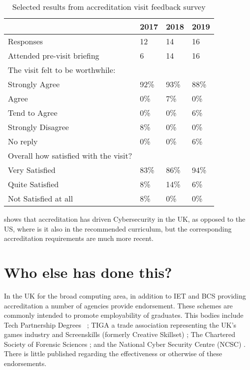\documentclass[sigconf]{acmart}
\begin{document}
\begin{table}[h!]
  \caption{Selected results from accreditation visit feedback survey}
  \label{table:1}
\begin{tabular}{ | p{5cm}|p{.75cm}|p{.75cm} |p{.75cm} |}
\hline
 & 2017 & 2018 & 2019   \\ \hline
Responses & 12 & 14 & 16   \\
\hline
Attended pre-visit briefing & 6 & 14 & 16   \\
\hline
The visit felt to be worthwhile: & & &  \\
Strongly Agree &92\% & 93\% &88\% \\
Agree &0\% & 7\% &0\% \\
Tend to Agree &0\% & 0\% &6\% \\
Strongly Disagree &8\% & 0\% &0\% \\
No reply &0\% & 0\% &6\% \\
\hline
Overall how satisfied with the visit? & & &  \\
Very Satisfied &83\% & 86\% &94\% \\
Quite Satisfied &8\% & 14\% &6\% \\
Not Satisfied at all &8\% & 0\% &0\% \\
\hline

\end{tabular}%
\end{table}
\cite{Cricketal2019} shows that accreditation has driven Cybersecurity in the UK, as opposed to the US, where is it also in the recommended curriculum, but the corresponding accreditation requirements are much more recent.

\section {Who else has done this?}	

In the UK for the broad computing area, in addition to IET and BCS providing accreditation a number of agencies provide endorsement. These schemes are commonly intended to promote employability of graduates. This bodies include Tech Partnership Degrees ~\cite{TP2019}; TIGA a trade association representing the UK's games industry and  Screenskills (formerly Creative Skillset) \cite{Screenskills2019}; The Chartered Society of Forensic Sciences \cite{CSOFS2019}; and the National Cyber Security Centre (NCSC) \cite{NCSC2018a}. There is little published regarding the effectiveness or otherwise of these endorsements.
\end{document}
